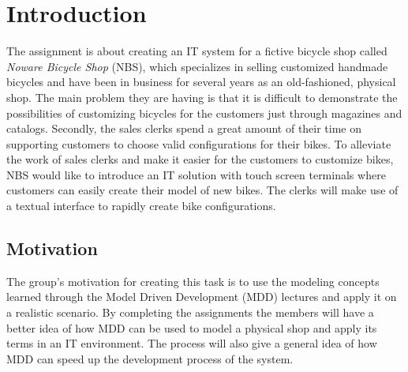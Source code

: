 \section{Introduction}
\label{sec.introduction}
\noindent The assignment is about creating an IT system for a fictive bicycle
shop called \emph{Noware Bicycle Shop} (NBS), which specializes in selling
customized handmade bicycles and have been in business for several years as an
old-fashioned, physical shop. The main problem they are having is that it is
difficult to demonstrate the possibilities of customizing bicycles for the
customers just through magazines and catalogs. Secondly, the sales clerks spend
a great amount of their time on supporting customers to choose valid
configurations for their bikes. To alleviate the work of sales clerks and make
it easier for the customers to customize bikes, NBS would like to introduce an
IT solution with touch screen terminals where customers can easily create their
model of new bikes. The clerks will make use of a textual interface to rapidly
create bike configurations.

\subsection{Motivation}
\noindent The group's motivation for creating this task is to use the modeling
concepts learned through the Model Driven Development (MDD) lectures and apply
it on a realistic scenario. By completing the assignments the members will
have a better idea of how MDD can be used to model a physical shop and apply its
terms in an IT environment.  The process will also give a general idea of how
MDD can speed up the development process of the system.

